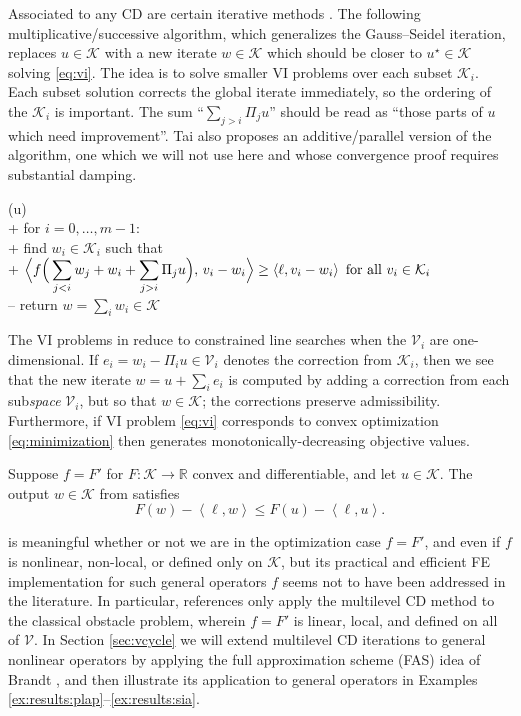 \documentclass[review,hidelinks,onefignum,onetabnum]{siamart220329}
\newcommand{\RR}{\mathbb{R}}
\newcommand{\cK}{\mathcal{K}}
\newcommand{\cV}{\mathcal{V}}
\newcommand{\ip}[2]{\left<#1,#2\right>}
\begin{document}
Associated to any CD are certain iterative methods \cite{Tai2003,Xu1992}.  The following multiplicative/successive  algorithm, which generalizes the Gauss--Seidel iteration, replaces $u \in \cK$ with a new iterate $w\in\cK$ which should be closer to $u^\star \in \cK$ solving \eqref{eq:vi}.  The idea is to solve smaller VI problems over each subset $\cK_i$.  Each subset solution corrects the global iterate immediately, so the ordering of the $\cK_i$ is important.  The sum ``$\sum_{j>i} \Pi_j u$'' should be read as ``those parts of $u$ which need improvement''.  Tai \cite{Tai2003} also proposes an additive/parallel version of the algorithm, one which we will not use here and whose convergence proof requires substantial damping.

\begin{pseudo*}
(u)\text{:} \\+
    for $i = 0,\dots,m-1$: \\+
        \rm{find} $w_i\in \cK_i$ \rm{such that} \\+
            $\displaystyle \Big<f\Big(\sum_{j<i} w_j + w_i + \sum_{j>i} \Pi_j u\Big),\, v_i - w_i\Big> \ge \ip{\ell}{v_i - w_i} \textnormal{ for all } v_i \in \cK_i$ \\--
    return $w=\sum_i w_i\in\cK$
\end{pseudo*}

The VI problems in  reduce to constrained line searches when the $\cV_i$ are one-dimensional.  If $e_i = w_i - \Pi_i u \in \cV_i$ denotes the correction from $\cK_i$, then we see that the new iterate $w = u + \sum_i e_i$ is computed by adding a correction from each sub\emph{space} $\cV_i$, but so that $w \in \cK$; the corrections preserve admissibility.  Furthermore, if VI problem \eqref{eq:vi} corresponds to convex optimization \eqref{eq:minimization} then  generates monotonically-decreasing objective values.

\begin{lemma} \cite{Tai2003}  Suppose $f=F'$ for $F:\cK\to\RR$ convex and differentiable, and let $u\in\cK$.  The output $w \in \cK$ from  satisfies
\begin{equation}
F(w) - \ip{\ell}{w} \le F(u) - \ip{\ell}{u}.  \label{eq:objectivemonotone}
\end{equation}
\end{lemma}

 is meaningful whether or not we are in the optimization case $f=F'$, and even if $f$ is nonlinear, non-local, or defined only on $\cK$, but its practical and efficient FE implementation for such general operators $f$ seems not to have been addressed in the literature.  In particular, references \cite{GraeserKornhuber2009,Tai2003} only apply the multilevel CD method to the classical obstacle problem, wherein $f=F'$ is linear, local, and defined on all of $\mathcal{V}$.  In Section \ref{sec:vcycle} we will extend multilevel CD iterations to general nonlinear operators by applying the full approximation scheme (FAS) idea of Brandt \cite{Brandt1977}, and then illustrate its application to general operators in Examples \ref{ex:results:plap}--\ref{ex:results:sia}.
\end{document}
